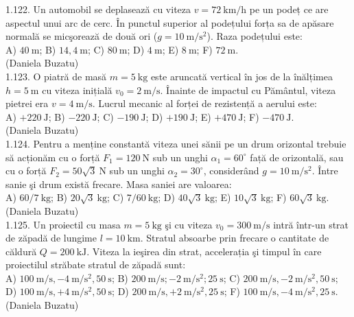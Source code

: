1.122. Un automobil se deplasează cu viteza $v=72 \mathrm{~km} / \mathrm{h}$ pe un podeț ce are aspectul unui arc de cerc. În punctul superior al podețului forța sa de apăsare normală se micşorează de două ori ($g=10 \mathrm{~m} / \mathrm{s}^{2}$). Raza podețului este:\\ A) $40 \mathrm{~m}$; B) $14,4 \mathrm{~m}$; C) $80 \mathrm{~m}$; D) $4 \mathrm{~m}$; E) $8 \mathrm{~m}$; F) $72 \mathrm{~m}$.\\ (Daniela Buzatu)\\

1.123. O piatră de masă $m=5 \mathrm{~kg}$ este aruncată vertical în jos de la înălțimea $h=5 \mathrm{~m}$ cu viteza inițială $v_{0}=2 \mathrm{~m} / \mathrm{s}$. Înainte de impactul cu Pământul, viteza pietrei era $v=4 \mathrm{~m} / \mathrm{s}$. Lucrul mecanic al forței de rezistență a aerului este:\\ A) $+220 \mathrm{~J}$; B) $-220 \mathrm{~J}$; C) $-190 \mathrm{~J}$; D) $+190 \mathrm{~J}$; E) $+470 \mathrm{~J}$; F) $-470 \mathrm{~J}$.\\ (Daniela Buzatu)\\

1.124. Pentru a menține constantă viteza unei sănii pe un drum orizontal trebuie să acționăm cu o forță $F_{1}=120 \mathrm{~N}$ sub un unghi $\alpha_{1}=60^{\circ}$ față de orizontală, sau cu o forță $F_{2}=50 \sqrt{3} \mathrm{~N}$ sub un unghi $\alpha_{2}=30^{\circ}$, considerând $g=10 \mathrm{~m} / \mathrm{s}^{2}$. Între sanie şi drum există frecare. Masa saniei are valoarea:\\ A) $60 / 7 \mathrm{~kg}$; B) $20 \sqrt{3} \mathrm{~kg}$; C) $7 / 60 \mathrm{~kg}$; D) $40 \sqrt{3} \mathrm{~kg}$; E) $10 \sqrt{3} \mathrm{~kg}$; F) $60 \sqrt{3} \mathrm{~kg}$.\\ (Daniela Buzatu)\\

1.125. Un proiectil cu masa $m=5 \mathrm{~kg}$ şi cu viteza $v_{0}=300 \mathrm{~m} / \mathrm{s}$ intră într-un strat de zăpadă de lungime $l=10 \mathrm{~km}$. Stratul absoarbe prin frecare o cantitate de căldură $Q=200 \mathrm{~kJ}$. Viteza la ieşirea din strat, accelerația şi timpul în care proiectilul străbate stratul de zăpadă sunt:\\ A) $100 \mathrm{~m} / \mathrm{s}, -4 \mathrm{~m} / \mathrm{s}^{2}, 50 \mathrm{~s}$; B) $200 \mathrm{~m} / \mathrm{s} ;-2 \mathrm{~m} / \mathrm{s}^{2} ; 25 \mathrm{~s}$; C) $200 \mathrm{~m} / \mathrm{s}, -2 \mathrm{~m} / \mathrm{s}^{2}, 50 \mathrm{~s}$; D) $100 \mathrm{~m} / \mathrm{s}, +4 \mathrm{~m} / \mathrm{s}^{2}, 50 \mathrm{~s}$; D) $200 \mathrm{~m} / \mathrm{s}, +2 \mathrm{~m} / \mathrm{s}^{2}, 25 \mathrm{~s}$; F) $100 \mathrm{~m} / \mathrm{s}, -4 \mathrm{~m} / \mathrm{s}^{2}, 25 \mathrm{~s}$.\\ (Daniela Buzatu)\\

